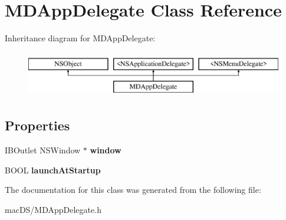 \hypertarget{interface_m_d_app_delegate}{\section{M\-D\-App\-Delegate Class Reference}
\label{interface_m_d_app_delegate}
}
Inheritance diagram for M\-D\-App\-Delegate\-:\begin{figure}[H]
\begin{center}
\leavevmode
\includegraphics[height=2.000000cm]{interface_m_d_app_delegate}
\end{center}
\end{figure}
\subsection*{Properties}
\begin{DoxyCompactItemize}
\item 
\hypertarget{interface_m_d_app_delegate_a0758151aaf56aadb705303b2715081c8}{I\-B\-Outlet N\-S\-Window $\ast$ {\bfseries window}}\label{interface_m_d_app_delegate_a0758151aaf56aadb705303b2715081c8}

\item 
\hypertarget{interface_m_d_app_delegate_a3344f6b269fb5ffe6c46ef57024f946c}{B\-O\-O\-L {\bfseries launch\-At\-Startup}}\label{interface_m_d_app_delegate_a3344f6b269fb5ffe6c46ef57024f946c}

\end{DoxyCompactItemize}


The documentation for this class was generated from the following file\-:\begin{DoxyCompactItemize}
\item 
mac\-D\-S/M\-D\-App\-Delegate.\-h\end{DoxyCompactItemize}
